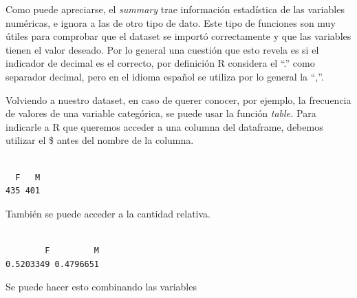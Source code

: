 \documentclass[
  letterpaper,
  DIV=11,
  numbers=noendperiod]{scrreprt}
\newenvironment{Shaded}{\begin{snugshade}}{\end{snugshade}}
\newcommand{\FunctionTok}[1]{\textcolor[rgb]{0.28,0.35,0.67}{#1}}
\newcommand{\NormalTok}[1]{\textcolor[rgb]{0.00,0.23,0.31}{#1}}
\newcommand{\SpecialCharTok}[1]{\textcolor[rgb]{0.37,0.37,0.37}{#1}}
\begin{document}
Como puede apreciarse, el \emph{summary} trae información estadística de
las variables numéricas, e ignora a las de otro tipo de dato. Este tipo
de funciones son muy útiles para comprobar que el dataset se importó
correctamente y que las variables tienen el valor deseado. Por lo
general una cuestión que esto revela es si el indicador de decimal es el
correcto, por definición R considera el ``.'' como separador decimal,
pero en el idioma español se utiliza por lo general la ``,''.

Volviendo a nuestro dataset, en caso de querer conocer, por ejemplo, la
frecuencia de valores de una variable categórica, se puede usar la
función \emph{table.} Para indicarle a R que queremos acceder a una
columna del dataframe, debemos utilizar el \$ antes del nombre de la
columna.

\begin{Shaded}
\end{Shaded}

\begin{verbatim}

  F   M 
435 401 
\end{verbatim}

También se puede acceder a la cantidad relativa.

\begin{Shaded}
\end{Shaded}

\begin{verbatim}

        F         M 
0.5203349 0.4796651 
\end{verbatim}

Se puede hacer esto combinando las variables

\begin{Shaded}
\end{Shaded}
\end{document}
